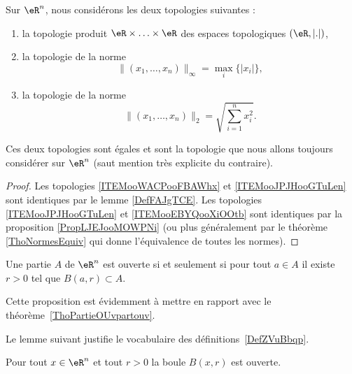 \begin{propositionDef}
    Sur \( \eR^n\), nous considérons les deux topologies suivantes :
    \begin{enumerate}
        \item       \label{ITEMooWACPooFBAWhx}
            la topologie produit \( \eR\times \ldots\times \eR\) des espaces topologiques \( (\eR,| . |)\),
        \item       \label{ITEMooJPJHooGTuLen}
            la topologie de la norme
            \begin{equation}
                \| (x_1,\ldots, x_n) \|_{\infty}=\max_i\{ | x_i | \},
            \end{equation}
        \item       \label{ITEMooEBYQooXiOOtb}
            la topologie de la norme
            \begin{equation}
                \| (x_1,\ldots, x_n) \|_2=\sqrt{ \sum_{i=1}^nx_i^2 }.
            \end{equation}
    \end{enumerate}
    Ces deux topologies sont égales et sont la topologie que nous allons toujours considérer sur \( \eR^n\) (saut mention très explicite du contraire).
\end{propositionDef}

\begin{proof}
    Les topologies \ref{ITEMooWACPooFBAWhx} et \ref{ITEMooJPJHooGTuLen} sont identiques par le lemme \ref{DefFAJgTCE}. Les topologies \ref{ITEMooJPJHooGTuLen} et \ref{ITEMooEBYQooXiOOtb} sont identiques par la proposition \ref{PropLJEJooMOWPNi} (ou plus généralement par le théorème \ref{ThoNormesEquiv} qui donne l'équivalence de toutes les normes).
\end{proof}

\begin{proposition}\label{PROPooEQYJooBbPiAj}
    Une partie \( A\) de \( \eR^n\) est ouverte si et seulement si pour tout \( a\in A\) il existe \( r>0\) tel que \( B(a,r)\subset A\).
\end{proposition}
Cette proposition est évidemment à mettre en rapport avec le théorème~\ref{ThoPartieOUvpartouv}.

Le lemme suivant justifie le vocabulaire des définitions~\ref{DefZVuBbqp}.
\begin{lemma}   \label{LemMESSExh}
    Pour tout $x \in \eR^n$ et tout $r >0$ la boule \( B(x,r)\) est ouverte.
\end{lemma}

